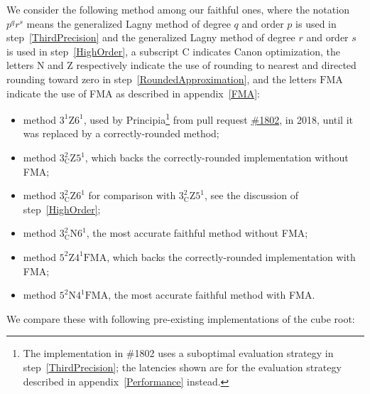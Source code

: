 ﻿\documentclass[10pt, a4paper, twoside]{basestyle}
\begin{document}
We consider the following method among our faithful ones, where the notation $p^qr^s$ means the generalized Lagny method of
degree $q$ and order $p$ is used in step~\ref{ThirdPrecision} and the generalized Lagny method of degree $r$ and order $s$
is used in step~\ref{HighOrder}, a subscript $\mathrm{C}$ indicates Canon optimization, the letters $\mathrm{N}$ and $\mathrm{Z}$ respectively indicate the use of rounding to nearest and directed rounding toward zero in step~\ref{RoundedApproximation},
and the letters $\mathrm{FMA}$ indicate the use of FMA as described in appendix~\ref{FMA}:
\begin{itemize}[nosep]
\item method $3^1\mathrm{Z}6^1$, used by Principia\footnote{The implementation in \#1802 uses a suboptimal evaluation strategy in step~\ref{ThirdPrecision}; the latencies shown are for the evaluation strategy described in appendix~\ref{Performance} instead.}
from pull request \href{https://github.com/mockingbirdnest/Principia/pull/1802}{\#1802},
in 2018, until it was replaced by a correctly-rounded method;
\item method $3^2_{\mathrm{C}}\mathrm{Z}5^1$, which backs the correctly-rounded implementation without FMA;
\item method $3^2_{\mathrm{C}}\mathrm{Z}6^1$ for comparison with $3^2_{\mathrm{C}}\mathrm{Z}5^1$, see the discussion of step~\ref{HighOrder};
\item method $3^2_{\mathrm{C}}\mathrm{N}6^1$, the most accurate faithful method without FMA;
\item method $5^2\mathrm{Z}4^1\mathrm{FMA}$, which backs the correctly-rounded implementation with FMA;
\item method $5^2\mathrm{N}4^1\mathrm{FMA}$, the most accurate faithful method with FMA.
\end{itemize}
We compare these with following pre-existing implementations of the cube root:
\end{document}
